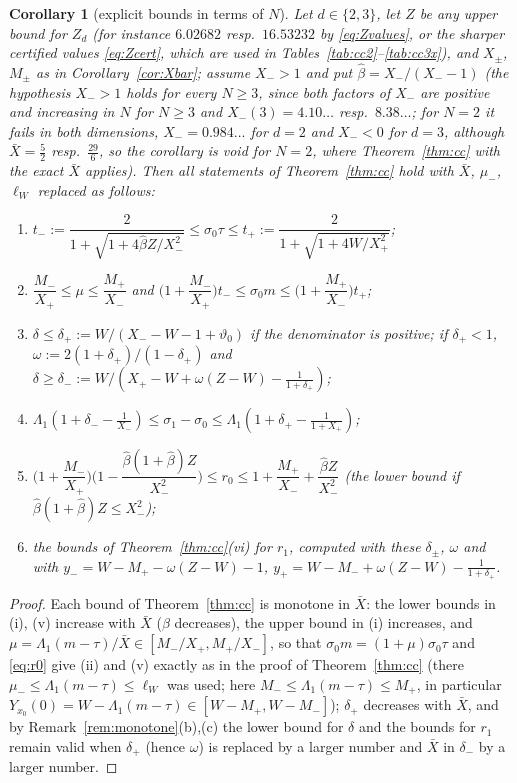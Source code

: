 \documentclass[11pt,a4paper]{article}
\newcommand{\Xb}{\bar X}
\theoremstyle{plain}
\newtheorem{corollary}[theorem]{Corollary}
\theoremstyle{definition}
\numberwithin{equation}{section}
\begin{document}
\begin{corollary}[explicit bounds in terms of $N$]\label{cor:explicitN}
Let $d\in\{2,3\}$, let $Z$ be any upper bound for $Z_d$ (for instance $6.02682$ resp.\ $16.53232$ by \eqref{eq:Zvalues}, or the sharper certified values \eqref{eq:Zcert}, which are used in Tables~\ref{tab:cc2}--\ref{tab:cc3x}), and $X_\pm$, $M_\pm$ as in Corollary~\ref{cor:Xbar}; assume $X_->1$ and put $\hat\beta=X_-/(X_--1)$ (the hypothesis $X_->1$ holds for every $N\ge3$, since both factors of $X_-$ are positive and increasing in $N$ for $N\ge3$ and $X_-(3)=4.10\ldots$ resp.\ $8.38\ldots$; for $N=2$ it fails in both dimensions, $X_-=0.984\ldots$ for $d=2$ and $X_-<0$ for $d=3$, although $\Xb=\frac52$ resp.\ $\frac{29}6$, so the corollary is void for $N=2$, where Theorem~\ref{thm:cc} with the exact $\Xb$ applies). Then all statements of Theorem~\ref{thm:cc} hold with $\Xb$, $\mu_-$, $\ell_W$ replaced as follows:
\begin{enumerate}
\item[(i)] $t_-:=\dfrac{2}{1+\sqrt{1+4\hat\beta Z/X_-^2}}\le\sigma_0\tau\le t_+:=\dfrac{2}{1+\sqrt{1+4W/X_+^2}}$;
\item[(ii)] $\dfrac{M_-}{X_+}\le\mu\le\dfrac{M_+}{X_-}$ and $\Big(1+\dfrac{M_-}{X_+}\Big)t_-\le\sigma_0m\le\Big(1+\dfrac{M_+}{X_-}\Big)t_+$;
\item[(iii)] $\delta\le\delta_+:=W/(X_--W-1+\vartheta_0)$ if the denominator is positive; if $\delta_+<1$, $\omega:=2(1+\delta_+)/(1-\delta_+)$ and $\delta\ge\delta_-:=W/(X_+-W+\omega(Z-W)-\frac{1}{1+\delta_+})$;
\item[(iv)] $\Lambda_1(1+\delta_--\frac1{X_-})\le\sigma_1-\sigma_0\le\Lambda_1(1+\delta_+-\frac{1}{1+X_+})$;
\item[(v)] $\Big(1+\dfrac{M_-}{X_+}\Big)\Big(1-\dfrac{\hat\beta(1+\hat\beta)Z}{X_-^2}\Big)\le r_0\le1+\dfrac{M_+}{X_-}+\dfrac{\hat\beta Z}{X_-^2}$ (the lower bound if $\hat\beta(1+\hat\beta)Z\le X_-^2$);
\item[(vi)] the bounds of Theorem~\ref{thm:cc}(vi) for $r_1$, computed with these $\delta_\pm$, $\omega$ and with $y_-=W-M_+-\omega(Z-W)-1$, $y_+=W-M_-+\omega(Z-W)-\frac{1}{1+\delta_+}$.
\end{enumerate}
\end{corollary}
\begin{proof}
Each bound of Theorem~\ref{thm:cc} is monotone in $\Xb$: the lower bounds in (i), (v) increase with $\Xb$ ($\beta$ decreases), the upper bound in (i) increases, and $\mu=\Lambda_1(m-\tau)/\Xb\in[M_-/X_+,M_+/X_-]$, so that $\sigma_0m=(1+\mu)\sigma_0\tau$ and \eqref{eq:r0} give (ii) and (v) exactly as in the proof of Theorem~\ref{thm:cc} (there $\mu_-\le\Lambda_1(m-\tau)\le\ell_W$ was used; here $M_-\le\Lambda_1(m-\tau)\le M_+$, in particular $Y_{x_0}(0)=W-\Lambda_1(m-\tau)\in[W-M_+,W-M_-]$); $\delta_+$ decreases with $\Xb$, and by Remark~\ref{rem:monotone}(b),(c) the lower bound for $\delta$ and the bounds for $r_1$ remain valid when $\delta_+$ (hence $\omega$) is replaced by a larger number and $\Xb$ in $\delta_-$ by a larger number.
\end{proof}
\end{document}
